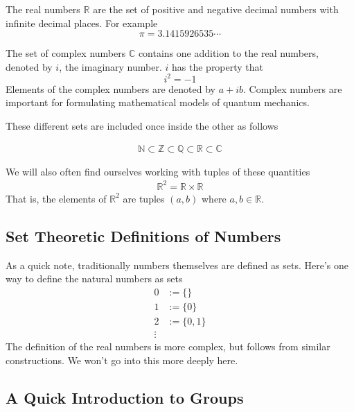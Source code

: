 \documentclass[../book.tex]{subfiles}
\begin{document}
The real numbers $\mathbb{R}$ are the set of positive and negative decimal numbers with infinite decimal places. For example
\begin{equation}
    \pi = 3.1415926535\cdots 
\end{equation}

The set of complex numbers $\mathbb{C}$ contains one addition to the real numbers, denoted by $i$, the imaginary number. $i$ has the property that
\begin{equation}
    i^2 = -1
\end{equation}
Elements of the complex numbers are denoted by $a + ib$. Complex numbers are important for formulating mathematical models of quantum mechanics.

These different sets are included once inside the other as follows

\begin{align}
    \mathbb{N} \subset \mathbb{Z} \subset \mathbb{Q} \subset \mathbb{R} \subset \mathbb{C}
\end{align}

We will also often find ourselves working with tuples of these quantities
\begin{align}
    \mathbb{R}^2 = \mathbb{R} \times \mathbb{R}
\end{align}
That is, the elements of $\mathbb{R}^2$ are tuples $(a,b)$ where $a, b \in \mathbb{R}$. 

\subsection{Set Theoretic Definitions of Numbers}

As a quick note, traditionally numbers themselves are defined as sets. Here's one way to define the natural numbers as sets
\begin{align}
0 &:= \{\} \\
1 &:= \{0\} \\
2 &:= \{0, 1\} \\
\vdots
\end{align}
The definition of the real numbers is more complex, but follows from similar constructions. We won't go into this more deeply here. 

\subsection{A Quick Introduction to Groups}
\end{document}
